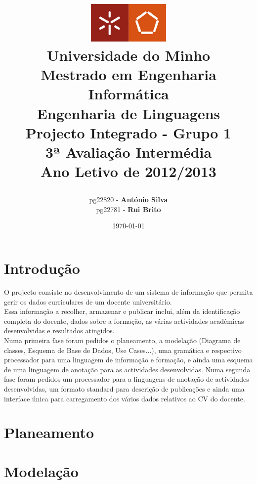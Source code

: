 \documentclass[a4paper,11pt,openright,openbib]{article}
\title{
	\large{\includegraphics[width=0.3\textwidth]{../../report-template/UM.jpg}} \\
	\large{Universidade do Minho}  \\
	\large{Mestrado em Engenharia Informática}  \\
	\large{Engenharia de Linguagens}  \\
	\large{Projecto Integrado - Grupo 1}  \\	
	\large{\textbf{3ª Avaliação Intermédia}} \\
	\large{Ano Letivo de 2012/2013} \\
	\date{\today}
}
\author{	
	\begin{tabular}[t]{c c}      
        pg22820 - \textbf{António Silva} \\        
	pg22781 - \textbf{Rui Brito} \\   				
	\\ 
	\end{tabular}
}
\begin{document}
\maketitle


\pagestyle{headings}
\newpage
\tableofcontents
\newpage

\section{Introdução}
O projecto consiste no desenvolvimento de um sistema de informação que permita gerir os dados curriculares de um docente universitário.\\
Essa informação a recolher, armazenar e publicar inclui, além da identificação completa do docente, dados sobre a formação, as várias actividades académicas desenvolvidas e resultados atingidos.\\
Numa primeira fase foram pedidos o planeamento, a modelação (Diagrama de classes, Esquema de Base de Dados, Use Cases...), uma gramática e respectivo processador para uma linguagem de informação e formação, e ainda uma esquema de uma linguagem de anotação para as actividades desenvolvidas.
Numa segunda fase foram pedidos um processador para a linguagens de anotação de actividades desenvolvidas, um formato standard para descrição de publicações e ainda uma interface única para carregamento dos vários dados relativos ao CV do docente.


\section{Planeamento}

\section{Modelação}
\end{document}
